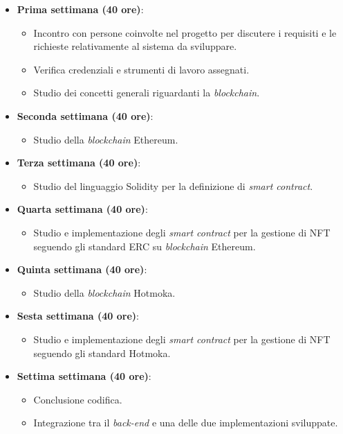 \begin{itemize}
  \item \textbf{Prima settimana (40 ore)}:
  \begin{itemize}
      \item Incontro con persone coinvolte nel progetto per discutere i requisiti e le richieste
      relativamente al sistema da sviluppare.
      \item Verifica credenziali e strumenti di lavoro assegnati.
      \item Studio dei concetti generali riguardanti la \emph{blockchain}.
  \end{itemize}
  \item \textbf{Seconda settimana (40 ore)}:
  \begin{itemize}
      \item Studio della \emph{blockchain} Ethereum.
  \end{itemize}
  \item \textbf{Terza settimana (40 ore)}:
  \begin{itemize}
      \item Studio del linguaggio Solidity per la definizione di \emph{smart contract}.
  \end{itemize}
  \item \textbf{Quarta settimana (40 ore)}:
  \begin{itemize}
      \item Studio e implementazione degli \emph{smart contract} per la gestione di NFT seguendo gli standard ERC su \emph{blockchain} Ethereum.
  \end{itemize}
  \item \textbf{Quinta settimana (40 ore)}:
  \begin{itemize}
      \item Studio della \emph{blockchain} Hotmoka.
  \end{itemize}
  \item \textbf{Sesta settimana (40 ore)}:
  \begin{itemize}
      \item Studio e implementazione degli \emph{smart contract} per la gestione di NFT seguendo gli standard Hotmoka.
  \end{itemize}
  \item \textbf{Settima settimana (40 ore)}:
  \begin{itemize}
      \item Conclusione codifica.
      \item Integrazione tra il \emph{back-end} e una delle due implementazioni sviluppate.

\end{itemize}
\end{itemize}
